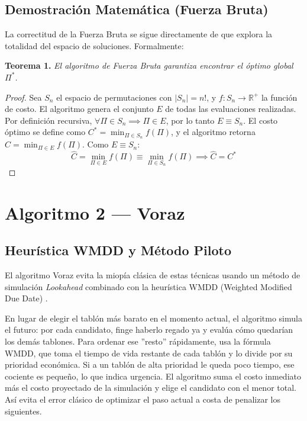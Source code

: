 \documentclass[conference, a4paper]{IEEEtran}
\begin{document}
\subsection{Demostración Matemática (Fuerza Bruta)}

La correctitud de la Fuerza Bruta se sigue directamente de que explora la totalidad del espacio de soluciones. Formalmente:

\textbf{Teorema 1.} \textit{El algoritmo de Fuerza Bruta garantiza encontrar el óptimo global $\Pi^*$.}

\begin{proof}
Sea $S_n$ el espacio de permutaciones con $|S_n| = n!$, y $f: S_n \to \mathbb{R}^+$ la función de costo.
El algoritmo genera el conjunto $E$ de todas las evaluaciones realizadas. Por definición recursiva, $\forall \Pi \in S_n \implies \Pi \in E$, por lo tanto $E \equiv S_n$.
El costo óptimo se define como $C^* = \min_{\Pi \in S_n} f(\Pi)$, y el algoritmo retorna $\hat{C} = \min_{\Pi \in E} f(\Pi)$.
Como $E \equiv S_n$:
\begin{equation}
\hat{C} = \min_{\Pi \in E} f(\Pi) \equiv \min_{\Pi \in S_n} f(\Pi) \implies \hat{C} = C^*
\end{equation}
\end{proof}

\section{Algoritmo 2 — Voraz}
\subsection{Heurística WMDD y Método Piloto}
El algoritmo Voraz evita la miopía clásica de estas técnicas usando un método de simulación \textit{Lookahead} combinado con la heurística WMDD (Weighted Modified Due Date) \cite{morton1993heuristic}.

En lugar de elegir el tablón más barato en el momento actual, el algoritmo simula el futuro: por cada candidato, finge haberlo regado ya y evalúa cómo quedarían los demás tablones. Para ordenar ese ''resto'' rápidamente, usa la fórmula WMDD, que toma el tiempo de vida restante de cada tablón y lo divide por su prioridad económica. Si a un tablón de alta prioridad le queda poco tiempo, ese cociente es pequeño, lo que indica urgencia. El algoritmo suma el costo inmediato más el costo proyectado de la simulación y elige el candidato con el menor total. Así evita el error clásico de optimizar el paso actual a costa de penalizar los siguientes.
\end{document}
